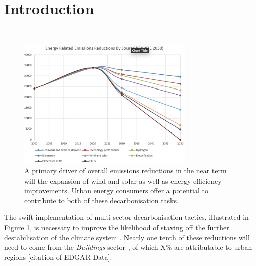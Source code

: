 
\section{Introduction}\

\begin{figure}[b]
    \centering
    \includegraphics[width=0.75\textwidth]{Figures_Draft/reduction_wedges_draft.png}
    \caption{A primary driver of overall emissions reductions in the near term will the expansion of wind and solar as well as energy efficiency improvements. Urban energy consumers offer a potential to contribute to both of these decarbonisation tasks.}
    \label{fig:carbonwedges}
\end{figure}


The swift implementation of multi-sector decarbonisation tactics, illustrated in Figure \ref{fig:carbonwedges}, is necessary to improve the likelihood of staving off the further destabilisation of the climate system \cite{sr15_ch2}. Nearly one tenth of these reductions will need to come from the \textit{Buildings} sector \cite{iea_net_2021}, of which X\% are attributable to urban regions [citation of EDGAR Data].

